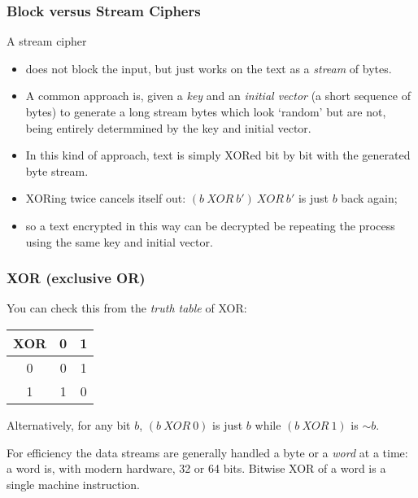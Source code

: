 \documentclass[10pt, hyperref={pdfpagelabels=false}]{beamer}
\begin{document}
\begin{frame}
\frametitle{Block versus Stream Ciphers}
A stream cipher
\begin{itemize}
\item does not block the input, but just works on the text as a \emph{stream} of bytes.
\item A common approach is, given a \emph{key} and an \emph{initial vector} (a short sequence of bytes) to generate a long stream bytes which look `random' but are not, being entirely determmined by the key and initial vector.
\item In this kind of approach, text is simply XORed bit by bit with the generated byte stream.
\item XORing twice cancels itself out: {\color{blue}$(b~XOR~b')~XOR~b'$} is just {\color{blue}$b$} back again;
\item so a text encrypted in this way can be decrypted be repeating the process using the same key and initial vector.
\end{itemize}
\end{frame}

\begin{frame}
\frametitle{XOR (exclusive OR)}
You can check this from the \emph{truth table} of XOR:

\begin{tabular}{c||c|c} 
XOR & 0 & 1 \\
\hline \hline
 0  & 0 & 1 \\
\hline 
 1  & 1 & 0 
\end{tabular}

Alternatively, for any bit $b$, $(b~XOR~0)$ is just $b$ while $(b~XOR~1)$ is $\sim b$.

For efficiency the data streams are generally handled a byte or a \emph{word} at a time: a word is, with modern hardware, 32 or 64 bits. Bitwise XOR of a word is a single machine instruction.
\end{frame}
\end{document}
